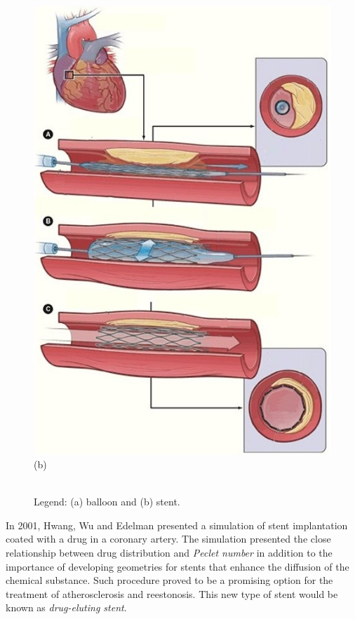 \begin{figure}[H]
\begin{minipage}{.50\linewidth}
      \includegraphics[scale=0.5]{./02_chaps/cap_review/figure/stent_bare.jpg}\\
      (b)
     \end{minipage}\\[3mm]
              \legend Legend:
              (a) balloon and
              (b) stent.
     \label{procedimentos PTCA}
\end{figure}

\medskip
In 2001, Hwang, Wu and Edelman \cite{hwang2001} presented a simulation of stent implantation
coated with a drug in a coronary artery. 
The simulation presented the
close relationship between drug distribution and \textit{Peclet number}
in addition to the importance of developing geometries for stents that enhance
the diffusion of the chemical substance. 
Such procedure proved to be a promising option
for the treatment of atherosclerosis and reestonosis. 
This new type of stent
would be known as \textit{drug-eluting stent}.


